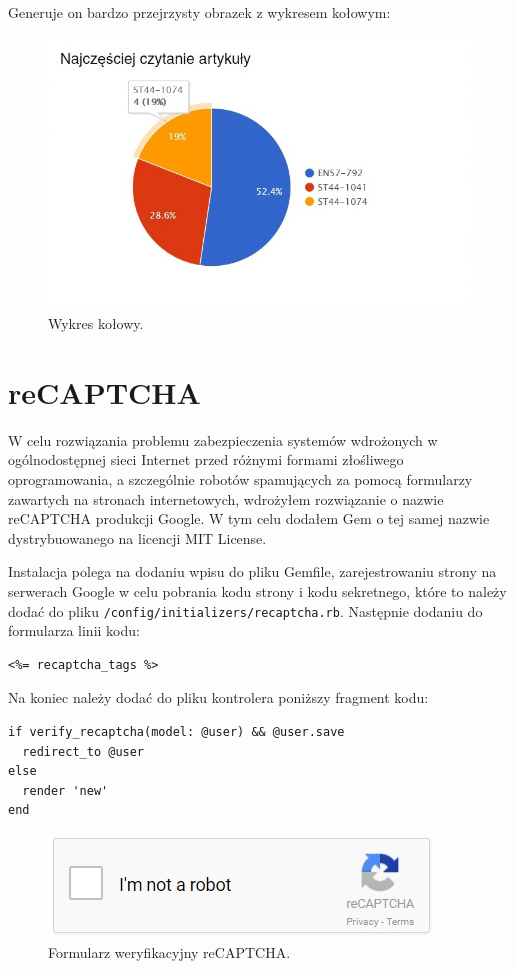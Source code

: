 \documentclass[openright]{xmgr}
\begin{document}
\newpage

Generuje on bardzo przejrzysty obrazek z wykresem kołowym:
\begin{figure}[!tbh]
\centering
\includegraphics[width=.8\linewidth]{fig/chartkick}
\caption{Wykres kołowy.}
\end{figure}

\section{reCAPTCHA}

W celu rozwiązania problemu zabezpieczenia systemów wdrożonych w ogólnodostępnej sieci Internet przed różnymi formami złośliwego oprogramowania, a szczególnie robotów spamujących za pomocą formularzy zawartych na stronach internetowych, wdrożyłem rozwiązanie o nazwie reCAPTCHA produkcji Google. W tym celu dodałem Gem o tej samej nazwie \cite{recaptcha} dystrybuowanego na licencji MIT License.

\newpage

Instalacja polega na dodaniu wpisu do pliku Gemfile, zarejestrowaniu strony na serwerach Google w celu pobrania kodu strony i kodu sekretnego, które to należy dodać do pliku \texttt{/config/initializers/recaptcha.rb}. Następnie dodaniu do formularza linii kodu:
\begin{lstlisting}[language=ruby2, caption={Kod wyświetlający formularz reCAPTCHA}]
<%= recaptcha_tags %>
\end{lstlisting}
Na koniec należy dodać do pliku kontrolera poniższy fragment kodu:
\begin{lstlisting}[language=ruby2, caption={Kod kontrolera weryfikujący reCAPTCHA}]
if verify_recaptcha(model: @user) && @user.save
  redirect_to @user
else
  render 'new'
end
\end{lstlisting}

\begin{figure}[!tbh]
\centering
\includegraphics[width=.6\linewidth]{fig/captcha}
\caption{Formularz weryfikacyjny reCAPTCHA.}
\end{figure}
\end{document}
